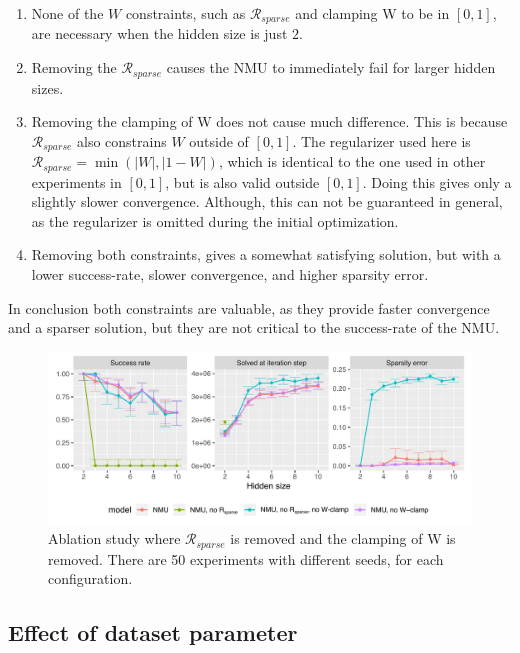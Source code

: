 \begin{enumerate}
    \item None of the $W$ constraints, such as $\mathcal{R}_{sparse}$ and clamping W to be in $[0, 1]$, are necessary when the hidden size is just $2$.
    \item Removing the $\mathcal{R}_{sparse}$ causes the NMU to immediately fail for larger hidden sizes.
    \item Removing the clamping of W does not cause much difference. This is because $\mathcal{R}_{sparse}$ also constrains $W$ outside of $[0, 1]$. The regularizer used here is $\mathcal{R}_{sparse} = \min(|W|, |1 - W|)$, which is identical to the one used in other experiments in $[0, 1]$, but is also valid outside $[0, 1]$. Doing this gives only a slightly slower convergence. Although, this can not be guaranteed in general, as the regularizer is omitted during the initial optimization.
    \item Removing both constraints, gives a somewhat satisfying solution, but with a lower success-rate, slower convergence, and higher sparsity error.
\end{enumerate}

In conclusion both constraints are valuable, as they provide faster convergence and a sparser solution, but they are not critical to the success-rate of the NMU.

\begin{figure}[h]
\centering
\includegraphics[width=\linewidth]{results/simple_function_static_mul_hidden_size_ablation.pdf}
\caption{Ablation study where $\mathcal{R}_{sparse}$ is removed and the clamping of W is removed. There are 50 experiments with different seeds, for each configuration.}
\label{fig:simple-function-static-ablation}
\end{figure}

\subsection{Effect of dataset parameter}
\label{sec:appendix-simple-function-task:dataset-parameter-effect}

